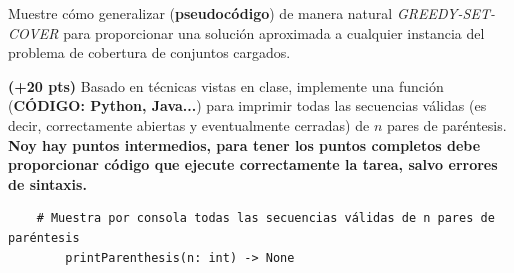 \documentclass[12pt, a4paper]{exam}
\begin{document}
\begin{questions}
	Muestre cómo generalizar (\textbf{pseudocódigo}) de manera natural 
    \textit{GREEDY-SET-COVER} para proporcionar una solución aproximada a cualquier 
    instancia del problema de cobertura de conjuntos cargados.


    \question \textbf{(+20 pts)} Basado en técnicas vistas en clase, implemente una 
    función (\textbf{CÓDIGO: Python, Java...}) para imprimir todas las secuencias
    válidas (es decir, correctamente abiertas y eventualmente cerradas) de $n$ pares de
    paréntesis.  \textbf{Noy hay puntos intermedios, para tener los puntos completos debe
    proporcionar código que ejecute correctamente la tarea, salvo errores de sintaxis.}
    \begin{verbatim}
    # Muestra por consola todas las secuencias válidas de n pares de paréntesis 
        printParenthesis(n: int) -> None
    \end{verbatim}

\end{questions}
\end{document}
